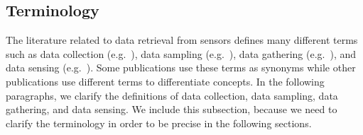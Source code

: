 \subsection{Terminology}

The literature related to data retrieval from sensors defines many different
terms such as data collection (e.g.~\cite{laiymani2013adaptive, liu2007energy,
wang2012adaptive}), data sampling (e.g.~\cite{willett2004backcasting,
jain2004adaptive, szczytowski2010asample}), data gathering
(e.g.~\cite{wang2012data, luo2009compressive, zhang2016data}), and data sensing
(e.g.~\cite{padhy2006utility, mahmudimanesh2012balanced, duarte2005joint}).
Some publications use these terms as synonyms while other publications use
different terms to differentiate concepts. In the following paragraphs, we
clarify the definitions of data collection, data sampling, data gathering, and
data sensing. We include this subsection, because we need to clarify the
terminology in order to be precise in the following sections.

